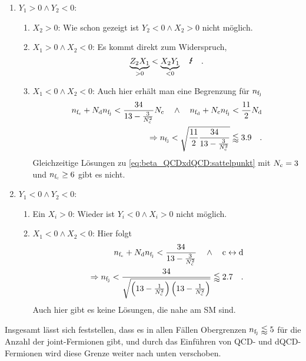 \begin{enumerate}
	\item $Y_1 > 0 \land Y_2 < 0$:
	  \begin{enumerate}
	   \item $X_2>0$:
	      Wie schon gezeigt ist $Y_2<0 \land X_2>0$ nicht möglich.
	   \item $X_1>0 \land X_2<0$: Es kommt direkt zum Widerspruch, 
	      \begin{equation}
	       \underbrace{Z_2 X_1}_{>0} <\underbrace{ X_2 Y_1}_{<0} \quad 
	       \blitz \quad .
	      \end{equation}
	   \item $X_1<0 \land X_2<0$: \label{Fall2c}
	      Auch hier erhält man eine Begrenzung für $n_{\text{f}_\text{j}}$
	      \begin{align}
	        n_{\text{f}_\text{c}} + N_\text{d} n_{\text{f}_\text{j}}<\frac{34}{13-\frac{3}{N_\text{c}^2}} N_\text{c} \quad
	        \land \quad n_{\text{f}_\text{d}} + N_\text{c} n_{\text{f}_\text{j}} < \frac{11}{2} N_\text{d} \\
	        \Rightarrow n_{\text{f}_\text{j}} < \sqrt{\frac{11}{2} \frac{34}{13-
	        \frac{3}{N_\text{c}^2}} } \lessapprox 3.9 \quad .
	      \end{align}
	      Gleichzeitige Lösungen zu \eqref{eq:beta_QCDxdQCD:sattelpunkt} 
	      mit $N_\text{c}=3$ und $n_{\text{f}_\text{c}}\geq 6$ gibt es nicht.
	  \end{enumerate}
	 \item $Y_1<0 \land Y_2<0$:
	  \begin{enumerate}
	   \item Ein $X_i>0$: Wieder ist $Y_i<0 \land X_i>0$ nicht möglich.
	   \item $X_1<0 \land X_2 < 0$: Hier folgt \label{Fall3b}
	    \begin{align}
	     n_{\text{f}_\text{c}} + N_\text{d} n_{\text{f}_\text{j}}<\frac{34}{13-\frac{3}{N_\text{c}^2}}  
	        \quad \land \quad \text{c} \leftrightarrow \text{d} \\
	     \Rightarrow n_{\text{f}_\text{j}}< 
	     \frac{34}{\sqrt{\left(13-\frac{1}{N_\text{c}^2}\right)
	     \left(13-\frac{1}{N_\text{c}^2}\right)}} \lessapprox 2.7  \quad .  
	    \end{align}
	    Auch hier gibt es keine Lösungen, die nahe am SM sind.
	  \end{enumerate}
      \end{enumerate}
      Insgesamt lässt sich feststellen, dass es in allen Fällen Obergrenzen 
      $n_{\text{f}_\text{j}}\lessapprox 5$  für die Anzahl der joint-Fermionen gibt, und durch 
      das Einführen von QCD- und dQCD-Fermionen wird diese Grenze weiter nach 
      unten verschoben.
      
      
      

